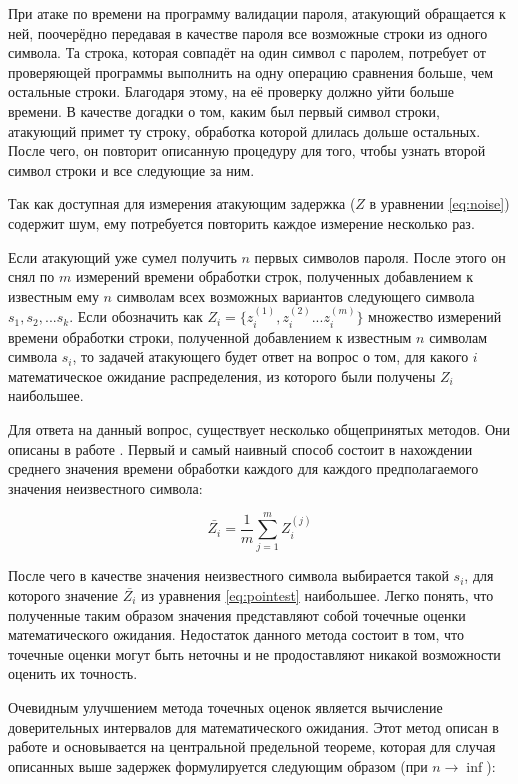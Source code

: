 При атаке по времени на программу валидации пароля, атакующий обращается к
ней, поочерёдно передавая в качестве пароля все возможные строки из одного
символа. Та строка, которая совпадёт на один символ с паролем, потребует от
проверяющей программы выполнить на одну операцию сравнения больше, чем остальные
строки. Благодаря этому, на её проверку должно уйти больше времени. В качестве
догадки о том, каким был первый символ строки, атакующий примет ту строку,
обработка которой длилась дольше остальных. После чего, он повторит описанную
процедуру для того, чтобы узнать второй символ строки и все следующие за ним.

Так как доступная для измерения атакующим задержка ($Z$ в уравнении
\ref{eq:noise}) содержит шум, ему потребуется повторить каждое измерение
несколько раз.

Если атакующий уже сумел получить $n$ первых символов пароля. После этого
он снял по $m$ измерений времени обработки строк, полученных добавлением к
известным ему $n$ символам всех возможных вариантов следующего символа $s_1,
s_2, ... s_k$. Если обозначить как $Z_i = \{ z_i^{(1)}, z_i^{(2)} ... z_i^{(m)}
\}$ множество измерений времени обработки строки, полученной добавлением к
известным $n$ символам символа $s_i$, то задачей атакующего будет ответ на
вопрос о том, для какого $i$ математическое ожидание распределения, из которого
были получены $Z_i$ наибольшее.

Для ответа на данный вопрос, существует несколько общепринятых методов. Они
описаны в работе \cite{anmodel}. Первый и самый наивный способ состоит в
нахождении среднего значения времени обработки каждого для каждого предполагаемого
значения неизвестного символа:

\begin{equation}
\bar{Z_i} = \frac{1}{m} \sum_{j=1}^m Z_i^{(j)}
\end{equation} \label{eq:pointest}

После чего в качестве значения неизвестного символа выбирается такой $s_i$, для
которого значение $\bar{Z_i}$ из уравнения \ref{eq:pointest} наибольшее. Легко
понять, что полученные таким образом значения представляют собой точечные оценки
математического ожидания. Недостаток данного метода состоит в том, что точечные
оценки могут быть неточны и не продоставляют никакой возможности оценить их
точность.

Очевидным улучшением метода точечных оценок является вычисление доверительных
интервалов для математического ожидания. Этот метод описан в работе
\cite{confint} и основывается на центральной предельной теореме, которая для
случая описанных выше задержек формулируется следующим образом (при $n \to \inf$):

